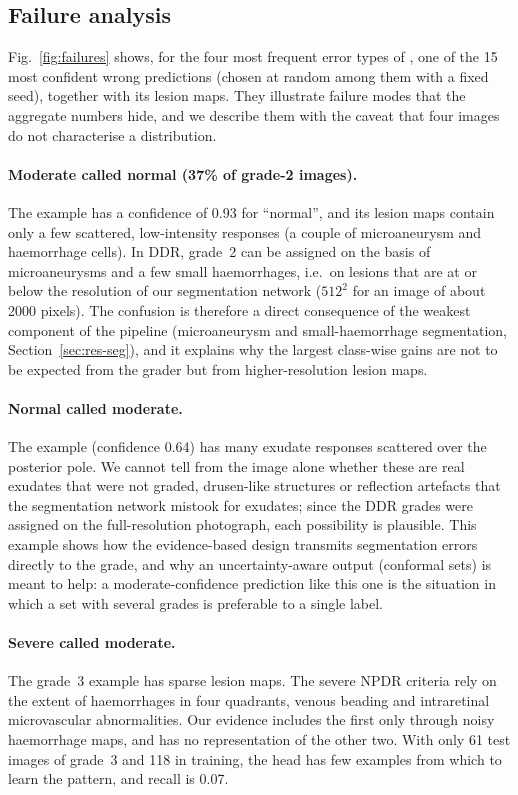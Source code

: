 \subsection{Failure analysis}
\label{sec:res-fail}
Fig.~\ref{fig:failures} shows, for the four most frequent error types of \mname, one of the 15 most confident wrong predictions (chosen at random among them with a fixed seed), together with its lesion maps. They illustrate failure modes that the aggregate numbers hide, and we describe them with the caveat that four images do not characterise a distribution.

\paragraph{Moderate called normal (37\% of grade-2 images).} The example has a confidence of 0.93 for ``normal'', and its lesion maps contain only a few scattered, low-intensity responses (a couple of microaneurysm and haemorrhage cells). In DDR, grade~2 can be assigned on the basis of microaneurysms and a few small haemorrhages, i.e.\ on lesions that are at or below the resolution of our segmentation network ($512^2$ for an image of about 2000 pixels). The confusion is therefore a direct consequence of the weakest component of the pipeline (microaneurysm and small-haemorrhage segmentation, Section~\ref{sec:res-seg}), and it explains why the largest class-wise gains are not to be expected from the grader but from higher-resolution lesion maps.

\paragraph{Normal called moderate.} The example (confidence 0.64) has many exudate responses scattered over the posterior pole. We cannot tell from the image alone whether these are real exudates that were not graded, drusen-like structures or reflection artefacts that the segmentation network mistook for exudates; since the DDR grades were assigned on the full-resolution photograph, each possibility is plausible. This example shows how the evidence-based design transmits segmentation errors directly to the grade, and why an uncertainty-aware output (conformal sets) is meant to help: a moderate-confidence prediction like this one is the situation in which a set with several grades is preferable to a single label.

\paragraph{Severe called moderate.} The grade~3 example has sparse lesion maps. The severe NPDR criteria rely on the extent of haemorrhages in four quadrants, venous beading and intraretinal microvascular abnormalities. Our evidence includes the first only through noisy haemorrhage maps, and has no representation of the other two. With only 61 test images of grade~3 and 118 in training, the head has few examples from which to learn the pattern, and recall is 0.07.

